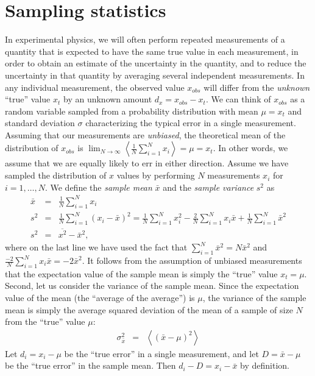 \documentclass{revtex4}
\begin{document}
\section{Sampling statistics}
In experimental physics, we will often perform repeated measurements
of a quantity that is expected to have the same true value in each measurement, in order
to obtain an estimate of the uncertainty in the quantity, and to
reduce the uncertainty in that quantity by averaging several
independent measurements. In any individual measurement, the observed
value $x_{obs}$ will differ from the \emph{unknown} ``true'' value $x_t$
by an unknown amount $d_x = x_{obs} - x_t$. We can think of $x_{obs}$
as a random variable sampled from a probability distribution with mean
$\mu = x_t$ and standard deviation $\sigma$ characterizing the typical
error in a single measurement. Assuming
that our measurements are \emph{unbiased}, the theoretical mean of the
distribution of $x_{obs}$ is $\lim_{N \rightarrow \infty}
\left<\frac{1}{N} \sum_{i=1}^N x_i \right> = \mu = x_t$. In other words, we assume that we are
equally likely to err in either direction. Assume we have sampled the distribution of $x$ values by
performing $N$ measurements $x_i$ for $i=1,\ldots,N$. We define the \emph{sample mean} $\bar{x}$ and the \emph{sample variance} $s^2$ as 
\begin{eqnarray}
  \bar{x} &=& \frac{1}{N} \sum_{i=1}^{N} x_i \label{samplemean} \\
  s^2 &=& \frac{1}{N} \sum_{i=1}^{N} (x_i - \bar{x})^2 = \frac{1}{N} \sum_{i=1}^N x_i^2 -\frac{2}{N} \sum_{i=1}^{N} x_i \bar{x} + \frac{1}{N} \sum_{i=1}^N \bar{x}^2 \nonumber \\
  s^2 &=& \overline{x^2} - \bar{x}^2 \label{samplevariance},
\end{eqnarray}
where on the last line we have used the fact that
$\sum_{i=1}^N \bar{x}^2 =  N\bar{x}^2$ and
$\frac{-2}{N}\sum_{i=1}^N x_i \bar{x} = -2\bar{x}^2$. It follows from
the assumption of unbiased measurements that the expectation value of
the sample mean is simply the ``true'' value $x_t = \mu$. Second, let us
consider the variance of the sample mean. Since the expectation value
of the mean (the ``average of the average'') is $\mu$, the variance of
the sample mean is simply the average squared deviation of the mean of a sample of
size $N$ from the ``true'' value $\mu$:
\begin{eqnarray}
  \sigma_{\bar{x}}^2 &=& \left<(\bar{x} - \mu)^2 \right>
\end{eqnarray}
Let $d_i = x_i - \mu$ be the ``true error'' in a single measurement,
and let $D = \bar{x} - \mu$ be the ``true error'' in the sample mean. Then
$d_i - D = x_i - \bar{x}$ by definition.
\end{document}
